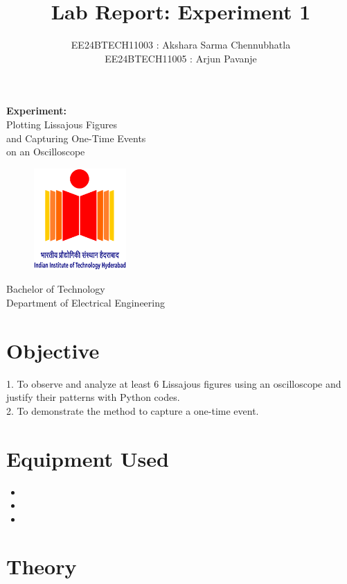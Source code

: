 \documentclass[a4paper,12pt]{article}
\title{\textbf{Lab Report: Experiment 1}}
\author{EE24BTECH11003 : Akshara Sarma Chennubhatla\\EE24BTECH11005 : Arjun Pavanje}
\begin{document}
\maketitle
\begin{center}
	\textbf{Experiment:}\\Plotting Lissajous Figures\\and Capturing One-Time Events\\on an Oscilloscope
\end{center}
\vspace{30pt}
\begin{figure}[h!]
	\centering
	\includegraphics[width = 100pt]{.logo/logo.png}\\
\end{figure}
\vspace{50pt}
\begin{center}
Bachelor of Technology\\
\vspace{10pt}
Department of Electrical Engineering\\
\end{center}
\newpage
\section*{Objective}
1. To observe and analyze at least 6 Lissajous figures using an oscilloscope and justify their patterns with Python codes.\\
2. To demonstrate the method to capture a one-time event.\\

\section*{Equipment Used}
\begin{itemize}
\item {}
    \item {}
    \item {}
\end{itemize}
\section*{Theory}
\end{document}
